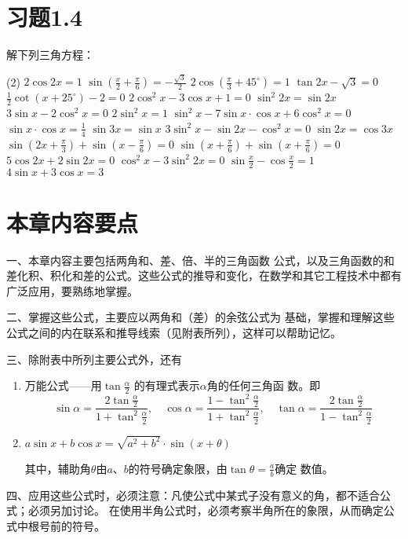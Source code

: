 \section*{习题1.4}
解下列三角方程：
    \begin{tasks}(2)
    \task $2\cos 2x=1$
    \task $\sin\left(\frac{x}{2}+\frac{\pi}{6}\right)=-\frac{\sqrt{3}}{2}$
    \task $2\cos\left(\frac{\pi}{3}+45^{\circ}\right)=1$
    \task $\tan2x-\sqrt{3}=0$
    \task $\frac{1}{2}\cot(x+25^{\circ})-2=0$
    \task $2\cos^2x-3\cos x+1=0$
    \task $\sin^2 2x=\sin 2x$
    \task $3\sin x-2\cos^2 x=0$
    \task $2\sin^2 x=1$
    \task $\sin^2 x-7\sin x\cdot \cos x+6\cos^2 x=0$
    \task $\sin x\cdot\cos x=\frac{1}{4}$
    \task $\sin 3x=\sin x$
    \task $3\sin^2 x-\sin 2x-\cos^2x=0$
    \task $\sin 2x=\cos 3x$
    \task $\sin\left(2x+\frac{\pi}{3}\right)+\sin\left(x-\frac{\pi}{6}\right)=0$
    \task $\sin\left(x+\frac{\pi}{6}\right)+\sin\left(x+\frac{\pi}{6}\right)=0$
    \task $5\cos2x+2\sin2x=0$
    \task $\cos^2x-3\sin^2 2x=0$
    \task $\sin\frac{x}{2}-\cos\frac{x}{2}=1$
    \task $4\sin x+3\cos x=3$
\end{tasks}

\section*{本章内容要点}
一、本章内容主要包括两角和、差、倍、半的三角函数
公式，以及三角函数的和差化积、积化和差的公式。这些公式的推导和变化，在数学和其它工程技术中都有广泛应用，要熟练地掌握。

二、掌握这些公式，主要应以两角和（差）的余弦公式为
基础，掌握和理解这些公式之间的内在联系和推导线索（见附表所列），这样可以帮助记忆。

三、除附表中所列主要公式外，还有
\begin{enumerate}
    \item 万能公式——用$\tan\frac{\alpha}{2}$
的有理式表示$\alpha$角的任何三角函
数。即
\[\sin\alpha=\frac{2\tan\frac{\alpha}{2}}{1+\tan^2\frac{\alpha}{2}},\quad \cos\alpha=\frac{1-\tan^2\frac{\alpha}{2}}{1+\tan^2\frac{\alpha}{2}},\quad \tan\alpha=\frac{2\tan\frac{\alpha}{2}}{1-\tan^2\frac{\alpha}{2}} \]

\item $a\sin x+b\cos x=\sqrt{a^2+b^2}\cdot \sin(x+\theta)$

其中，辅助角$\theta$由$a$、$b$的符号确定象限，由$\tan\theta=\frac{a}{b}$确定
数值。
\end{enumerate}

四、应用这些公式时，必须注意：凡使公式中某式子没有意义的角，都不适合公式；必须另加讨论。
在使用半角公式时，必须考察半角所在的象限，从而确定公式中根号前的符号。

